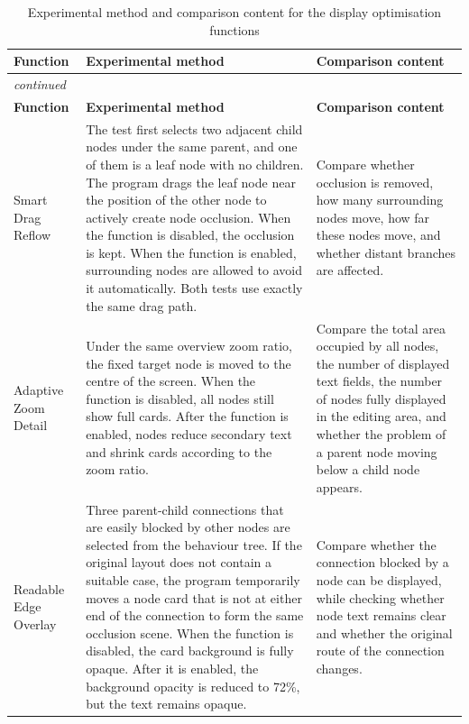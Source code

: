 \begin{center}

\begin{longtable}{@{}p{} p{} p{}@{}}
\caption{Experimental method and comparison content for the display optimisation functions}\label{tab:display-experiment-methods}\\
\toprule
\textbf{Function} & \textbf{Experimental method} & \textbf{Comparison content} \\
\midrule
\endfirsthead
\multicolumn{3}{l}{\itshape continued}\\
\toprule
\textbf{Function} & \textbf{Experimental method} & \textbf{Comparison content} \\
\midrule
\endhead
Smart Drag Reflow & The test first selects two adjacent child nodes under the same parent, and one of them is a leaf node with no children. The program drags the leaf node near the position of the other node to actively create node occlusion. When the function is disabled, the occlusion is kept. When the function is enabled, surrounding nodes are allowed to avoid it automatically. Both tests use exactly the same drag path. & Compare whether occlusion is removed, how many surrounding nodes move, how far these nodes move, and whether distant branches are affected. \\
Adaptive Zoom Detail & Under the same overview zoom ratio, the fixed target node is moved to the centre of the screen. When the function is disabled, all nodes still show full cards. After the function is enabled, nodes reduce secondary text and shrink cards according to the zoom ratio. & Compare the total area occupied by all nodes, the number of displayed text fields, the number of nodes fully displayed in the editing area, and whether the problem of a parent node moving below a child node appears. \\
Readable Edge Overlay & Three parent-child connections that are easily blocked by other nodes are selected from the behaviour tree. If the original layout does not contain a suitable case, the program temporarily moves a node card that is not at either end of the connection to form the same occlusion scene. When the function is disabled, the card background is fully opaque. After it is enabled, the background opacity is reduced to 72\%, but the text remains opaque. & Compare whether the connection blocked by a node can be displayed, while checking whether node text remains clear and whether the original route of the connection changes. \\

\end{longtable}
\end{center}
